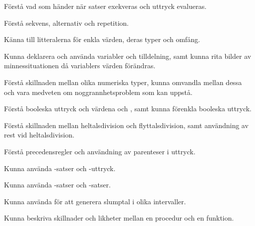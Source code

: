 
\item Förstå vad som händer när satser exekveras och uttryck evalueras.
\item Förstå sekvens, alternativ och repetition.
\item Känna till litteralerna för enkla värden, deras typer och omfång.
\item Kunna deklarera och använda variabler och tilldelning, samt kunna rita bilder av minnessituationen då variablers värden förändras.
\item Förstå skillnaden mellan olika numeriska typer, kunna omvandla mellan dessa och vara medveten om noggrannhetsproblem som kan uppstå.
\item Förstå booleska uttryck och värdena  och , samt kunna förenkla booleska uttryck.
\item Förstå skillnaden mellan heltalsdivision och flyttalsdivision, samt användning av rest vid heltalsdivision.
\item Förstå precedensregler och användning av parenteser i uttryck.
\item Kunna använda -satser och -uttryck.
\item Kunna använda -satser och -satser.
\item Kunna använda  för att generera slumptal i olika intervaller.
\item Kunna beskriva skillnader och likheter mellan en procedur och en funktion.
